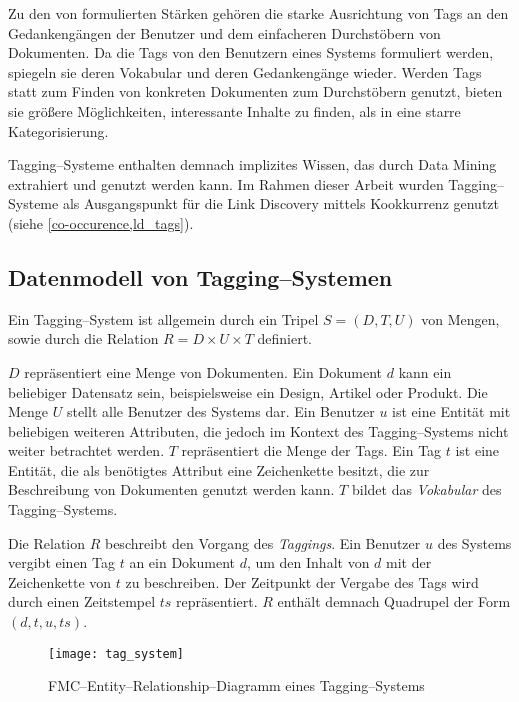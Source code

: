 Zu den von \textcite{ma2004} formulierten Stärken gehören die starke Ausrichtung von Tags an den Gedankengängen der Benutzer und dem einfacheren Durchstöbern von Dokumenten. Da die Tags von den Benutzern eines Systems formuliert werden, spiegeln sie deren Vokabular und deren Gedankengänge wieder. Werden Tags statt zum Finden von konkreten Dokumenten zum Durchstöbern genutzt, bieten sie größere Möglichkeiten, interessante Inhalte zu finden, als in eine starre Kategorisierung.

Tagging--Systeme enthalten demnach implizites Wissen, das durch Data Mining extrahiert und genutzt werden kann. Im Rahmen dieser Arbeit wurden Tagging--Systeme als Ausgangspunkt für die Link Discovery mittels Kookkurrenz genutzt (siehe \cref{co-occurence,ld_tags}).

\subsection{Datenmodell von Tagging--Systemen}
\label{tagging_data}

Ein Tagging--System ist allgemein durch ein Tripel \(S=(D, T, U)\) von Mengen, sowie durch die Relation \(R = D \times U \times T\) definiert. 

\(D\) repräsentiert eine Menge von Dokumenten. Ein Dokument \(d\) kann ein beliebiger Datensatz sein, beispielsweise ein Design, Artikel oder Produkt. Die Menge \(U\) stellt alle Benutzer des Systems dar. Ein Benutzer \(u\) ist eine Entität mit beliebigen weiteren Attributen, die jedoch im Kontext des Tagging--Systems nicht weiter betrachtet werden. \(T\) repräsentiert die Menge der Tags. Ein Tag \(t\) ist eine Entität, die als benötigtes Attribut eine Zeichenkette besitzt, die zur Beschreibung von Dokumenten genutzt werden kann. \(T\) bildet das \emph{Vokabular} des Tagging--Systems.

Die Relation \(R\) beschreibt den Vorgang des \emph{Taggings}. Ein Benutzer \(u\) des Systems vergibt einen Tag \(t\) an ein Dokument \(d\), um den Inhalt von \(d\) mit der Zeichenkette von \(t\) zu beschreiben. Der Zeitpunkt der Vergabe des Tags wird durch einen Zeitstempel \(ts\) repräsentiert. \(R\) enthält demnach Quadrupel der Form \((d,t,u,ts)\).

\begin{figure}[t]
\centering
\texttt{[image: tag\_system]}
\caption{FMC--Entity--Relationship--Diagramm eines Tagging--Systems}
\label{fig:tagging_erd}
\end{figure}

